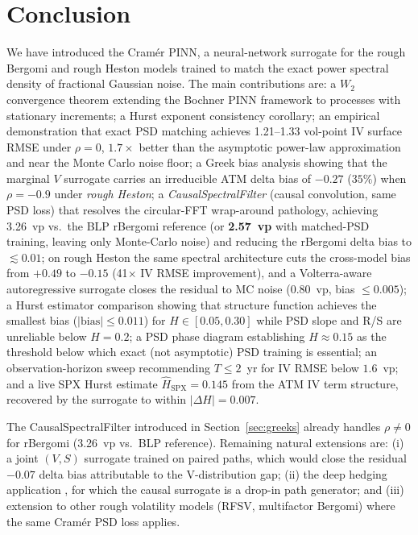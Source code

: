 \documentclass[11pt,a4paper]{article}
\begin{document}
\section{Conclusion}
\label{sec:conclusion}

We have introduced the Cramér PINN, a neural-network surrogate for the
rough Bergomi and rough Heston models trained to match the exact power
spectral density of fractional Gaussian noise. The main contributions
are: a $W_2$ convergence theorem extending the Bochner PINN framework to
processes with stationary increments; a Hurst exponent consistency
corollary; an empirical demonstration that exact PSD matching achieves
1.21--1.33 vol-point IV surface RMSE under $\rho = 0$, $1.7\times$
better than the asymptotic power-law approximation and near the Monte
Carlo noise floor; a Greek bias analysis showing that the marginal $V$ surrogate carries
an irreducible ATM delta bias of $-0.27$ ($35\%$) when $\rho = -0.9$
under \emph{rough Heston}; a \emph{CausalSpectralFilter} (causal
convolution, same PSD loss) that resolves the circular-FFT wrap-around
pathology, achieving 3.26~vp vs.\ the BLP rBergomi reference (or
\textbf{2.57~vp} with matched-PSD training, leaving only Monte-Carlo
noise) and reducing the rBergomi delta bias to $\lesssim 0.01$; on rough
Heston the same spectral architecture cuts the cross-model bias from
$+0.49$ to $-0.15$ (41$\times$ IV RMSE improvement), and a
Volterra-aware autoregressive surrogate closes the residual to MC noise
(0.80~vp, bias $\leq 0.005$); a Hurst estimator comparison showing that
structure function achieves the smallest bias ($|\text{bias}|\leq 0.011$)
for $H\in[0.05,0.30]$ while PSD slope and R/S are unreliable below $H=0.2$;
a PSD phase diagram establishing $H\approx 0.15$ as the threshold below
which exact (not asymptotic) PSD training is essential; an observation-horizon
sweep recommending $T\leq 2$~yr for IV RMSE below $1.6$~vp; and a live SPX
Hurst estimate $\hat{H}_\mathrm{SPX}=0.145$ from the ATM IV term structure,
recovered by the surrogate to within $|\Delta H|=0.007$.

The CausalSpectralFilter introduced in Section~\ref{sec:greeks} already
handles $\rho \neq 0$ for rBergomi (3.26~vp vs.\ BLP reference).
Remaining natural extensions are: (i) a joint $(V, S)$ surrogate trained
on paired paths, which would close the residual $-0.07$ delta bias
attributable to the V-distribution gap; (ii) the deep hedging application
\citep{buhler2019deep}, for which the causal surrogate is a drop-in path
generator; and (iii) extension to other rough volatility models (RFSV,
multifactor Bergomi) where the same Cramér PSD loss applies.
\end{document}
